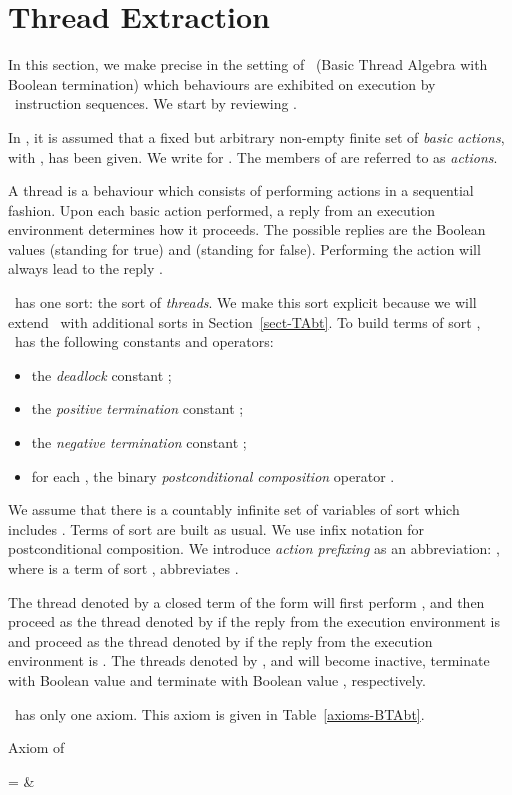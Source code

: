 \documentclass[fleqn]{llncs}
\begin{document}
\section{Thread Extraction}
\label{sect-BTAbt}

In this section, we make precise in the setting of \BTAbt\ (Basic Thread
Algebra with Boolean termination) which behaviours are exhibited on
execution by \PGLBbt\ instruction sequences.
We start by reviewing \BTAbt.

In \BTAbt, it is assumed that a fixed but arbitrary non-empty finite set
 of \emph{basic actions}, with , has been
given.
We write  for .
The members of  are referred to as \emph{actions}.

A thread is a behaviour which consists of performing actions in a
sequential fashion.
Upon each basic action performed, a reply from an execution environment
determines how it proceeds.
The possible replies are the Boolean values  (standing for true)
and  (standing for false).
Performing the action  will always lead to the reply .

\BTAbt\ has one sort: the sort  of \emph{threads}.
We make this sort explicit because we will extend \BTAbt\ with
additional sorts in Section~\ref{sect-TAbt}.
To build terms of sort , \BTAbt\ has the following constants and
operators:
\begin{itemize}
\item
the \emph{deadlock} constant ;
\item
the \emph{positive termination} constant ;
\item
the \emph{negative termination} constant ;
\item
for each , the binary \emph{postconditional composition}
operator .
\end{itemize}
We assume that there is a countably infinite set of variables of sort
 which includes .
Terms of sort  are built as usual.
We use infix notation for postconditional composition.
We introduce \emph{action prefixing} as an abbreviation: ,
where  is a term of sort , abbreviates .

The thread denoted by a closed term of the form  will
first perform , and then proceed as the thread denoted by 
if the reply from the execution environment is  and proceed as
the thread denoted by  if the reply from the execution environment is
.
The threads denoted by ,  and  will become
inactive, terminate with Boolean value  and terminate with
Boolean value , respectively.

\BTAbt\ has only one axiom.
This axiom is given in Table~\ref{axioms-BTAbt}.\begin{table}[!tb]
\caption{Axiom of \BTAbt}
\label{axioms-BTAbt}
\begin{eqntbl}
\begin{axcol}
 =                      & 
\end{axcol}
\end{eqntbl}
\end{table}
\end{document}
